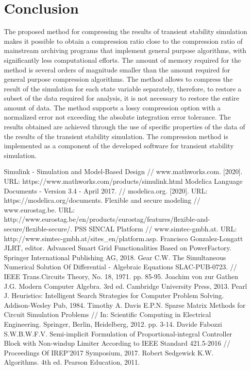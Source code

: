 \documentclass[lettersize,journal]{IEEEtran}
\begin{document}
\section{Conclusion}
The proposed method for compressing the results of transient stability simulation makes it possible to obtain a compression ratio 
close to the compression ratio of mainstream archiving programs that implement general purpose algorithms, with significantly 
less computational efforts. The amount of memory required for the method is several orders of magnitude smaller than the amount 
required for general purpose compression algorithms. The method allows to compress the result of the simulation for each 
state variable separately, therefore, to restore a subset of the data required for analysis, it is not necessary to restore 
the entire amount of data. The method supports a lossy compression option with a normalized error not exceeding the absolute 
integration error tolerance. The results obtained are achieved through the use of specific properties of the data of the results of the 
transient stability simulation. The compression method is implemented as a component of the developed software for 
transient stability simulation.

\begin{thebibliography}{1}

Simulink - Simulation and Model-Based Design // www.mathworks.com. [2020]. URL: https://www.mathworks.com/products/simulink.html
Modelica Language Documents - Version 3.4 - April 2017. // modelica.org. [2020]. URL: https://modelica.org/documents. 
Flexible and secure modeling // www.eurostag.be. URL: http://www.eurostag.be/en/products/eurostag/features/flexible-and-secure/flexible-secure/.
PSS SINCAL Platform // www.simtec-gmbh.at. URL: http://www.simtec-gmbh.at/sites\_en/platform.asp.
Francisco Gonzalez-Longatt JLRT, editor. Advanced Smart Grid Functionalities Based on PowerFactory. Springer International Publishing AG, 2018.
Gear C.W. The Simultaneous Numerical Solution Of Differential - Algebraic Equations SLAC-PUB-0723. // IEEE Trans.Circuits Theory, No. 18, 1971. pp. 85-95.
Joachim von zur Gathen J.G. Modern Computer Algebra. 3rd ed. Cambridge University Press, 2013.
Pearl J. Heuristics: Intelligent Search Strategies for Computer Problem Solving. Addison-Wesley Pub, 1984.
Timothy A. Davis E.P.N. Sparse Matrix Methods for Circuit Simulation Problems // In: Scientific Computing in Electrical Engineering. Springer, Berlin, Heidelberg, 2012. pp. 3-14.
Davide Fabozzi S.W.B.W.F.V. Semi-implicit Formulation of Proportional-integral Controller Block with Non-windup Limiter According to IEEE Standard 421.5-2016 // Proceedings Of IREP'2017 Symposium, 2017.
Robert Sedgewick K.W. Algorithms. 4th ed. Pearson Education, 2011.



\end{thebibliography}
\end{document}
